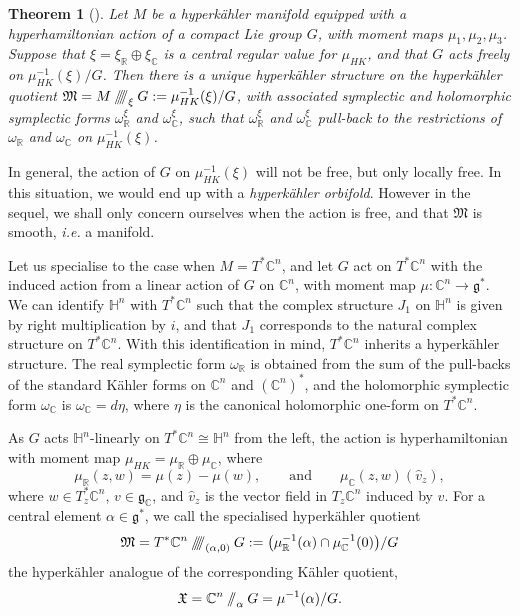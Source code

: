 \documentclass{article}
\newtheorem{theorem}{Theorem}[section]
\newcommand{\ie}{\emph{i.e.} }
\newcommand{\w}{\omega}
\newcommand{\K}{K\"ahler }
\newcommand{\HK}{hyperk\"ahler }
\newcommand{\RR}{\mathbb{R}}
\newcommand{\CC}{\mathbb{C}}
\newcommand{\HH}{\mathbb{H}}
\newcommand{\mf}[1]{\mathfrak{#1}}
\newcommand{\sslash}{\mathbin{/\mkern-6mu/}}
\newcommand{\sssslash}{\mathbin{/\mkern-6mu/\mkern-6mu/\mkern-6mu/}}
\begin{document}
	\begin{theorem}[\cite{HKLR87}]
		Let $M$ be a \HK manifold equipped with a hyperhamiltonian action of a compact Lie group $G$, with moment maps $\mu_{1}, \mu_{2}, \mu_{3}$. Suppose that $\xi = \xi_{\RR} \oplus \xi_{\CC}$ is a central regular value for $\mu_{HK}$, and that $G$ acts freely on $\mu_{HK}^{-1}(\xi)/G$. Then there is a unique \HK structure on the \HK quotient $\mf{M} = M\sssslash_{\xi}G := \mu_{HK}^{-1}(\xi)/G$, with associated symplectic and holomorphic symplectic forms $\w_{\RR}^{\xi}$ and $\w_{\CC}^{\xi}$, such that $\w_{\RR}^{\xi}$ and $\w_{\CC}^{\xi}$ pull-back to the restrictions of $\w_{\RR}$ and $\w_{\CC}$ on $\mu_{HK}^{-1}(\xi)$.
	\end{theorem}
	In general, the action of $G$ on $\mu_{HK}^{-1}(\xi)$ will not be free, but only locally free. In this situation, we would end up with a \emph{\HK orbifold}. However in the sequel, we shall only concern ourselves when the action is free, and that $\mf{M}$ is smooth, \ie a manifold.
	
	Let us specialise to the case when $M = T^{\ast}\CC^{n}$, and let $G$ act on $T^{\ast}\CC^{n}$ with the induced action from a linear action of $G$ on $\CC^{n}$, with moment map $\mu : \CC^{n} \rightarrow \mf{g}^{\ast}$. We can identify $\HH^{n}$ with $T^{\ast}\CC^{n}$ such that the complex structure $J_{1}$ on $\HH^{n}$ is given by right multiplication by $i$, and that $J_{1}$ corresponds to the natural complex structure on $T^{\ast}\CC^{n}$. With this identification in mind, $T^{\ast}\CC^{n}$ inherits a \HK structure. The real symplectic form $\w_{\RR}$ is obtained from the sum of the pull-backs of the standard \K forms on $\CC^{n}$ and $(\CC^{n})^{\ast}$, and the holomorphic symplectic form $\w_{\CC}$ is $\w_{\CC} = d\eta$, where $\eta$ is the canonical holomorphic one-form on $T^{\ast}\CC^{n}$.
	
	As $G$ acts $\HH^{n}$-linearly on $T^{\ast}\CC^{n} \cong \HH^{n}$ from the left, the action is hyperhamiltonian with moment map $\mu_{HK} = \mu_{\RR} \oplus \mu_{\CC}$, where
	$$
	\mu_{\RR}(z,w) = \mu(z) - \mu(w),\qquad \text{and} \qquad \mu_{\CC}(z,w)(\hat{v}_{z}),
	$$
	where $w\in T_{z}^{\ast}\CC^{n}$, $v \in \mf{g}_{\CC}$, and $\hat{v}_{z}$ is the vector field in $T_{z}\CC^{n}$ induced by $v$. For a central element $\alpha \in \mf{g}^{\ast}$, we call the specialised \HK quotient
	$$
	\mf{M} = T^{\ast}\CC^{n}\sssslash_{(\alpha,0)}G := \big( \mu_{\RR}^{-1}(\alpha) \cap \mu_{\CC}^{-1}(0)\big)/G
	$$
	the \HK analogue of the corresponding \K quotient,
	$$
	\mf{X} = \CC^{n} \sslash_{\alpha} G = \mu^{-1}(\alpha)/G.
	$$
	
\end{document}
